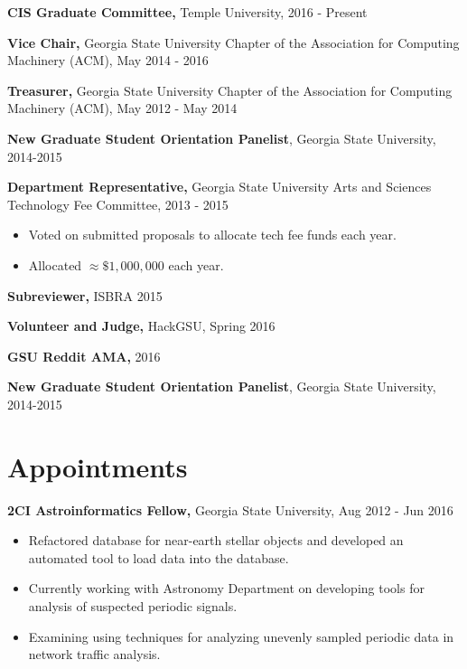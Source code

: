 \documentclass{res}
\begin{document}
\begin{resume}
\textbf{CIS Graduate Committee,} Temple University, 2016 - Present

{\bf Vice Chair,} Georgia State University Chapter of the Association for Computing Machinery (ACM),  May 2014 - 2016

{\bf Treasurer,} Georgia State University Chapter of the Association for Computing Machinery (ACM), May 2012 - May 2014

{\bf New Graduate Student Orientation Panelist}, Georgia State University, 2014-2015


{\bf Department Representative,} Georgia State University Arts and Sciences Technology Fee Committee, 2013 - 2015
\begin{itemize}
	\item Voted on submitted proposals to allocate tech fee funds each year.
	\item Allocated $\approx \$1,000,000$ each year.
\end{itemize}

{\bf Subreviewer,} ISBRA 2015

{\bf Volunteer and Judge,} HackGSU, Spring 2016

{\bf GSU Reddit AMA,} 2016



{\bf New Graduate Student Orientation Panelist}, Georgia State University, 2014-2015



\section{Appointments}

{\bf 2CI Astroinformatics Fellow,} Georgia State University, Aug 2012 - Jun 2016
     \begin{itemize}
     \item Refactored database for near-earth stellar objects and developed an automated tool to load data into the database.
     \item Currently working with Astronomy Department on developing tools for analysis of suspected periodic signals.
     \item Examining using techniques for analyzing unevenly sampled periodic data in network traffic analysis.
     \end{itemize}   



\end{resume}
\end{document}
